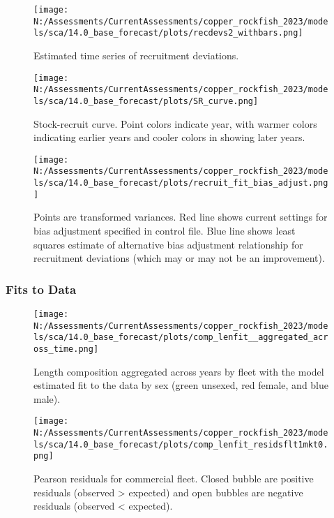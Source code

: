 \documentclass[11pt,
  english,
  letterpaper,
]{article}
\begin{document}
\pagebreak

\begin{figure}
\centering
\texttt{[image: N:/Assessments/CurrentAssessments/copper\_rockfish\_2023/models/sca/14.0\_base\_forecast/plots/recdevs2\_withbars.png]}
\caption{Estimated time series of recruitment deviations.\label{fig:rec-devs}}
\end{figure}

\pagebreak

\begin{figure}
\centering
\texttt{[image: N:/Assessments/CurrentAssessments/copper\_rockfish\_2023/models/sca/14.0\_base\_forecast/plots/SR\_curve.png]}
\caption{Stock-recruit curve. Point colors indicate year, with warmer colors indicating earlier years and cooler colors in showing later years.\label{fig:bh-curve}}
\end{figure}

\pagebreak

\begin{figure}
\centering
\texttt{[image: N:/Assessments/CurrentAssessments/copper\_rockfish\_2023/models/sca/14.0\_base\_forecast/plots/recruit\_fit\_bias\_adjust.png]}
\caption{Points are transformed variances. Red line shows current settings for bias adjustment specified in control file. Blue line shows least squares estimate of alternative bias adjustment relationship for recruitment deviations (which may or may not be an improvement).\label{fig:bias-adjust}}
\end{figure}

\newpage

\hypertarget{fits-to-data}{%
\subsubsection{Fits to Data}\label{fits-to-data}}

\begin{figure}
\centering
\texttt{[image: N:/Assessments/CurrentAssessments/copper\_rockfish\_2023/models/sca/14.0\_base\_forecast/plots/comp\_lenfit\_\_aggregated\_across\_time.png]}
\caption{Length composition aggregated across years by fleet with the model estimated fit to the data by sex (green unsexed, red female, and blue male).\label{fig:len-agg-fit}}
\end{figure}

\pagebreak

\begin{figure}
\centering
\texttt{[image: N:/Assessments/CurrentAssessments/copper\_rockfish\_2023/models/sca/14.0\_base\_forecast/plots/comp\_lenfit\_residsflt1mkt0.png]}
\caption{Pearson residuals for commercial fleet. Closed bubble are positive residuals (observed \textgreater{} expected) and open bubbles are negative residuals (observed \textless{} expected).\label{fig:com-dead-pearson}}
\end{figure}
\end{document}
